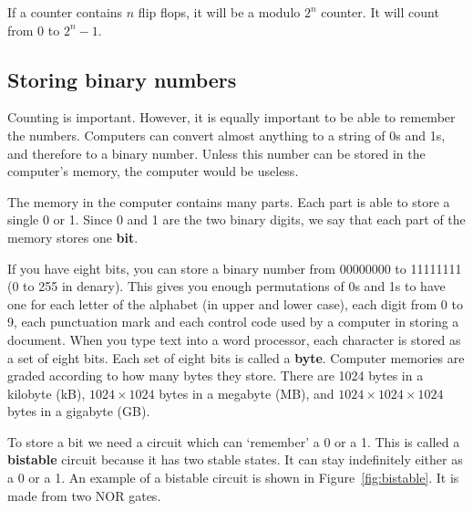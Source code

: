 
\begin{IFact}{If a counter contains $n$ flip flops, it will be a modulo $2^{n}$ counter.  It will count from 0 to $2^{n} - 1$.}\end{IFact}

\subsection{Storing binary numbers}

Counting is important.  However, it is equally important to be able to remember the numbers.  Computers can convert almost anything to a string of 0s and 1s, and therefore to a binary number.  Unless this number can be stored in the computer's memory, the computer would be useless.

The memory in the computer contains many parts.  Each part is able to store a single 0 or 1.  Since 0 and 1 are the two binary digits, we say that each part of the memory stores one {\bf bit}.


\begin{IFact}{If you have eight bits, you can store a binary number from 00000000 to 11111111 (0 to 255 in denary).  This gives you enough permutations of 0s and 1s to have one for each letter of the alphabet (in upper and lower case), each digit from 0 to 9, each punctuation mark and each control code used by a computer in storing a document.  When you type text into a word processor, each character is stored as a set of eight bits.  Each set of eight bits is called a {\bf byte}.  Computer memories are graded according to how many bytes they store.  There are 1024 bytes in a kilobyte (kB), $1024 \times 1024$ bytes in a megabyte (MB), and $1024 \times 1024 \times 1024$ bytes in a gigabyte (GB).} \end{IFact}

To store a bit we need a circuit which can `remember' a 0 or a 1.  This is called a {\bf bistable} circuit because it has two stable states.  It can stay indefinitely either as a 0 or a 1.  An example of a bistable circuit is shown in Figure~\ref{fig:bistable}.  It is made from two NOR gates.

